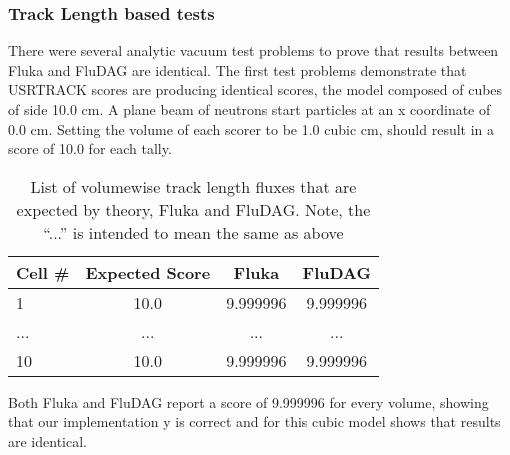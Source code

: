 \documentclass{anstrans}
\begin{document}
\subsubsection*{Track Length based tests}
There were several analytic vacuum test problems to prove that results
between Fluka and FluDAG are identical. The first test problems
demonstrate that USRTRACK scores are producing identical scores, the
model composed of cubes of side 10.0 cm. A plane beam of neutrons
start particles at an x coordinate of 0.0 cm. Setting the volume of
each scorer to be 1.0 cubic cm, should result in a score of 10.0 for
each tally.
\begin{table}[h!]
	\begin{center}
		\begin{tabular}{|l|c|c|c|}
			\hline
			Cell \# & Expected Score & Fluka  & FluDAG \\
			\hline
			1 & 10.0 & 9.999996 & 9.999996 \\
			... & ... & ... & ... \\
			10 & 10.0 & 9.999996 & 9.999996 \\
			\hline
		\end{tabular}
	\caption{List of volumewise track length fluxes that are 
				expected by theory, Fluka and FluDAG. Note, the ``...''
				is intended to mean the same as above}
	\end{center}
	\label{usrtrack_comp}
\end{table}

Both Fluka and FluDAG report a score of 9.999996 for every volume,
showing that our implementation y is correct and for this cubic model
shows that results are identical.
\end{document}
